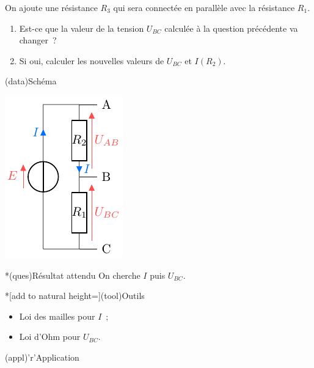 \documentclass[../../main/main.tex]{subfiles}
\begin{document}
{On ajoute une résistance $R_3$ qui sera connectée en parallèle avec la
résistance $R_1$.
\begin{enumerate}[resume]
  \item Est-ce que la valeur de la tension $U_{BC}$ calculée à la question
        précédente va changer~?
  \item Si oui, calculer les nouvelles valeurs de $U_{BC}$ et $I(R_2)$.
\end{enumerate}
}{
\begin{tcbraster}[raster columns=3, raster equal height=rows]
    \begin{tcb}(data){Schéma}
        \begin{center}
            \includegraphics{divtens}
        \end{center}
    \end{tcb}
    \begin{tcolorbox}[blankest, raster multicolumn=1, space to=\myspace]
        \begin{tcbraster}[raster columns=1]
            \begin{tcb}*(ques){Résultat attendu}
                On cherche $I$ puis $U_{BC}$.
            \end{tcb}
            \begin{tcb}*[add to natural height=\myspace](tool){Outils}
                \begin{itemize}[leftmargin=10pt]
                    \item Loi des mailles pour $I$~;
                    \item Loi d'Ohm pour $U_{BC}$.
                \end{itemize}
            \end{tcb}
        \end{tcbraster}
    \end{tcolorbox}
    \begin{tcb}(appl)'r'{Application}

\end{tcb}
\end{tcbraster}}
\end{document}

